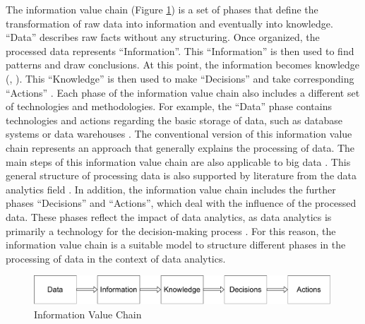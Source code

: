The information value chain (Figure \ref{information_value_chain}) is a set of phases that define the transformation of raw data into information and eventually into knowledge. \enquote{Data} describes raw facts without any structuring. Once organized, the processed data represents \enquote{Information}. This \enquote{Information} is then used to find patterns and draw conclusions. At this point, the information becomes knowledge (\cite{Fayyad.1996}, \cite{Fayyad.1996b}). This \enquote{Knowledge} is then used to make \enquote{Decisions} and take corresponding \enquote{Actions} \parencite{Sharma.2014}. Each phase of the information value chain also includes a different set of technologies and methodologies. For example, the \enquote{Data} phase contains technologies and actions regarding the basic storage of data, such as database systems or data warehouses \parencite{Abbasi.2016}. The conventional version of this information value chain represents an approach that generally explains the processing of data. The main steps of this information value chain are also applicable to big data \parencite{Abbasi.2016}. This general structure of processing data is also supported by literature from the data analytics field \parencite{Runkler.2020}. In addition, the information value chain includes the further phases \enquote{Decisions} and \enquote{Actions}, which deal with the influence of the processed data. These phases reflect the impact of data analytics, as data analytics is primarily a technology for the decision-making process \parencite{Runkler.2020}. For this reason, the information value chain is a suitable model to structure different phases in the processing of data in the context of data analytics.

\begin{figure}[htbp]
    \includegraphics[width=0.99\textwidth, keepaspectratio]{content/02_theretical_foundations/informationValueChain.pdf}
    \caption{Information Value Chain}    
    \label{information_value_chain}
\end{figure}


